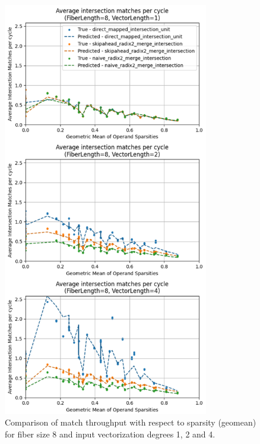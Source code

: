 \begin{figure}[H]
    \centering
    \includegraphics[width=0.8\textwidth]{figures/isect_model_fl8_vl1.pdf}
    \caption{Comparison of match throughput with respect to sparsity (geomean) for fiber size 8 and input vectorization degrees 1, 2 and 4.}
    \label{fig:isect_model_fl8_vl1}
\end{figure}

\clearpage

